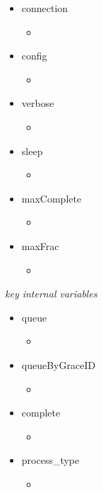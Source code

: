 \documentclass{article}
\begin{document}
\begin{itemize}
    \item{connection
        \begin{itemize}
            \item{}
        \end{itemize}
         }
    \item{config
        \begin{itemize}
            \item{}
        \end{itemize}
         }
    \item{verbose
        \begin{itemize}
            \item{}
        \end{itemize}
         }
    \item{sleep
        \begin{itemize}
            \item{}
        \end{itemize}
         }
    \item{maxComplete
        \begin{itemize}
            \item{}
        \end{itemize}
         }
    \item{maxFrac
        \begin{itemize}
            \item{}
        \end{itemize}
         }
\end{itemize}

\noindent
\textit{key internal variables}

\begin{itemize}
    \item{queue
        \begin{itemize}
            \item{}
        \end{itemize}
         }
    \item{queueByGraceID
        \begin{itemize}
            \item{}
        \end{itemize}
         }
    \item{complete
        \begin{itemize}
            \item{}
        \end{itemize}
         }
    \item{process\_type
        \begin{itemize}
            \item{}
        \end{itemize}
         }
\end{itemize}
\end{document}
